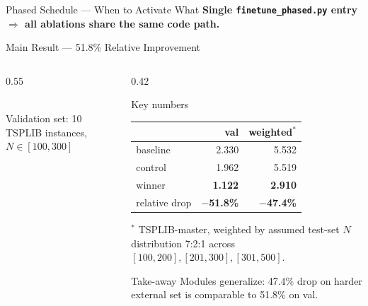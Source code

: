 \documentclass[aspectratio=169,11pt]{beamer}
\begin{document}
\begin{frame}{Phased Schedule --- When to Activate What}
  \vspace{0.2cm}
  \centering
  {\color{sdmblue}\textbf{Single \texttt{finetune\_phased.py} entry $\Rightarrow$ all ablations share the same code path.}}
\end{frame}

\begin{frame}{Main Result --- 51.8\% Relative Improvement}
  \begin{columns}[T,totalwidth=\textwidth]
    \begin{column}{0.55\textwidth}
      \centering
      \\[-0.1cm]
      {\footnotesize Validation set: 10 TSPLIB instances, $N \in [100, 300]$}
    \end{column}
    \begin{column}{0.42\textwidth}
      \begin{block}{Key numbers}
        \footnotesize
        \begin{tabularx}{\linewidth}{Xrr}
          \toprule
                       & val   & weighted$^*$ \\
          \midrule
          baseline     & 2.330 & 5.532 \\
          control      & 1.962 & 5.519 \\
          winner       & \textbf{1.122} & \textbf{2.910} \\
          \midrule
          relative drop & \textbf{$-$51.8\%} & \textbf{$-$47.4\%} \\
          \bottomrule
        \end{tabularx}
      \end{block}
      {\scriptsize $^*$ TSPLIB-master, weighted by assumed test-set $N$ distribution 7:2:1 across $[100,200], [201,300], [301,500]$.}
      \begin{alertblock}{Take-away}
        Modules generalize: 47.4\% drop on harder external set is comparable to 51.8\% on val.
      \end{alertblock}
    \end{column}
  \end{columns}
\end{frame}
\end{document}
